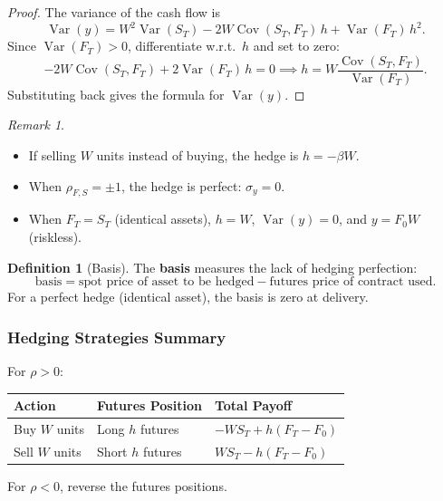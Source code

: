 \documentclass[12pt, a4paper]{article}
\theoremstyle{plain}
\theoremstyle{definition}
\newtheorem{definition}[theorem]{Definition}
\theoremstyle{remark}
\newtheorem{remark}[theorem]{Remark}
\begin{document}
\begin{proof}
  The variance of the cash flow is
  \[
    \operatorname{Var}(y) = W^2\operatorname{Var}(S_T) - 2W\operatorname{Cov}(S_T,F_T)\,h + \operatorname{Var}(F_T)\,h^2.
  \]
  Since $\operatorname{Var}(F_T) > 0$, differentiate w.r.t.\ $h$ and set to zero:
  \[
    -2W\operatorname{Cov}(S_T,F_T) + 2\operatorname{Var}(F_T)\,h = 0 \implies h = W\frac{\operatorname{Cov}(S_T,F_T)}{\operatorname{Var}(F_T)}.
  \]
  Substituting back gives the formula for $\operatorname{Var}(y)$.
\end{proof}

\begin{remark}
  \begin{itemize}
    \item If selling $W$ units instead of buying, the hedge is $h = -\beta W$.
    \item When $\rho_{F,S} = \pm 1$, the hedge is perfect: $\sigma_y = 0$.
    \item When $F_T = S_T$ (identical assets), $h = W$, $\operatorname{Var}(y) = 0$, and $y = F_0 W$ (riskless).
  \end{itemize}
\end{remark}

\begin{definition}[Basis]
  The \textbf{basis} measures the lack of hedging perfection:
  \[
    \text{basis} = \text{spot price of asset to be hedged} - \text{futures price of contract used}.
  \]
  For a perfect hedge (identical asset), the basis is zero at delivery.
\end{definition}

\subsubsection*{Hedging Strategies Summary}

For $\rho > 0$:
\begin{center}
\begin{tabular}{lll}
  \hline
  Action & Futures Position & Total Payoff \\
  \hline
  Buy $W$ units & Long $h$ futures & $-WS_T + h(F_T - F_0)$ \\
  Sell $W$ units & Short $h$ futures & $WS_T - h(F_T - F_0)$ \\
  \hline
\end{tabular}
\end{center}

For $\rho < 0$, reverse the futures positions.
\end{document}
